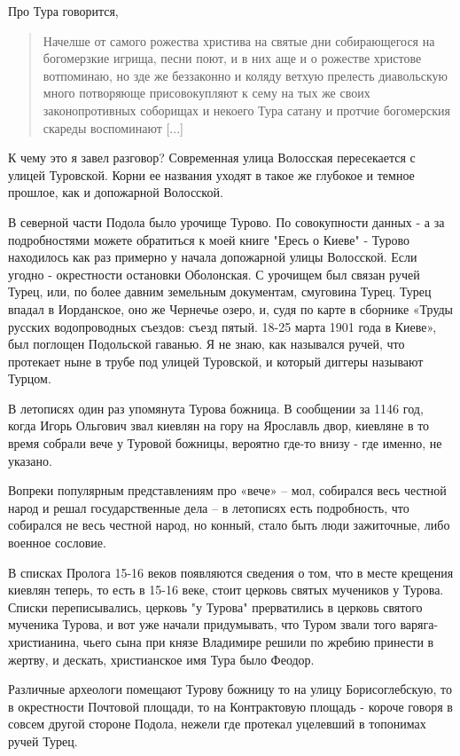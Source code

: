 \documentclass[a5paper,11pt,openany]{article}
\begin{document}
   Про Тура говорится, 

\begin{quotation}
\noindent Начелше от самого рожества христива на святые дни собирающегося на богомерзкие игрища, песни поют, и в них аще и о рожестве христове вотпоминаю, но зде же беззаконно и коляду ветхую прелесть диавольскую много потворяюще присовокупляют к сему на тых же своих законопротивных соборищах и некоего Тура сатану и протчие богомерския скареды воспоминают [...]
\end{quotation}

   К чему это я завел разговор? Современная улица Волосская пересекается с улицей Туровской. Корни ее названия уходят в такое же глубокое и темное прошлое, как и допожарной Волосской.

   В северной части Подола было урочище Турово. По совокупности данных - а за подробностями можете обратиться к моей книге "Ересь о Киеве" - Турово находилось как раз примерно у начала допожарной улицы Волосской. Если угодно - окрестности остановки Оболонская. С урочищем был связан ручей Турец, или, по более давним земельным документам, смуговина Турец. Турец впадал в Иорданское, оно же Чернечье озеро, и, судя по карте в сборнике «Труды русских водопроводных съездов: съезд пятый. 18-25 марта 1901 года в Киеве», был поглощен Подольской гаванью. Я не знаю, как назывался ручей, что протекает ныне в трубе под улицей Туровской, и который диггеры называют Турцом.

    В летописях один раз упомянута Турова божница. В сообщении за 1146 год, когда Игорь Ольгович звал киевлян на гору на Ярославль двор, киевляне в то время собрали вече у Туровой божницы, вероятно
где-то внизу - где именно, не указано. 

   Вопреки популярным представлениям про «вече» – мол, собирался весь честной народ и решал государственные дела – в летописях есть подробность, что собирался не весь честной народ, но конный, стало быть люди зажиточные, либо военное сословие.

   В списках Пролога 15-16 веков появляются сведения о том, что в месте крещения киевлян теперь, то есть в 15-16 веке, стоит церковь святых мучеников у Турова. Списки переписывались, церковь "у Турова" прерватились в церковь святого мученика Турова, и вот уже начали придумывать, что Туром звали того варяга-христианина, чьего сына при князе Владимире решили по жребию принести в жертву, и дескать, христианское имя Тура было Феодор.

   Различные археологи помещают Турову божницу то на улицу Борисоглебскую, то в окрестности Почтовой площади, то на Контрактовую площадь - короче говоря в совсем другой стороне Подола, нежели где протекал уцелевший в топонимах ручей Турец. 
\end{document}
